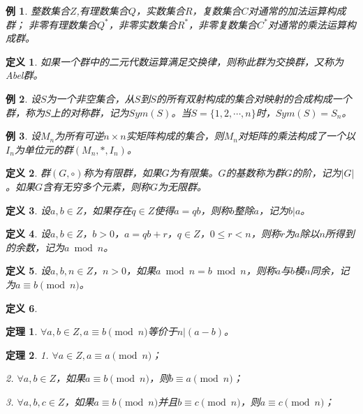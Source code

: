 \documentclass{article}
\newtheorem{Def}{定义}
\newtheorem{Thm}{定理}
\newtheorem*{Example}{例}
\begin{document}
\begin{CJK*}{UTF8}{gbsn}
\begin{Example}
  整数集合$Z$,有理数集合$Q$，实数集合$R$，复数集合$C$对通常的加法运算构成群；
  非零有理数集合$Q^*$，非零实数集合$R^*$，非零复数集合$C^*$对通常的乘法运算构成群。
\end{Example}
\begin{Def}
  如果一个群中的二元代数运算满足交换律，则称此群为交换群，又称为Abel群。
\end{Def}
\begin{Example}
设$S$为一个非空集合，从$S$到$S$的所有双射构成的集合对映射的合成构成一个群，称为$S$上的对称群，记为$Sym(S)$。当$S=\{1,2,\cdots,n\}$时，$Sym(S)=S_n$。
\end{Example}
  \begin{Example}
    设$M_n$为所有可逆$n\times n$实矩阵构成的集合，则$M_n$对矩阵的乘法构成了一个以$I_n$为单位元的群$(M_n,*,I_n)$。
  \end{Example}
\begin{Def}
  群$(G,\circ)$称为有限群，如果$G$为有限集。$G$的基数称为群$G$的阶，记为$|G|$。如果$G$含有无穷多个元素，则称$G$为无限群。
\end{Def}

\begin{Def}
  设$a,b\in Z$，如果存在$q\in Z$使得$a=qb$，则称$b$整除$a$，记为$b|a$。
\end{Def}
\begin{Def}
  设$a,b\in Z$，$b>0$，$a=qb+r$，$q\in Z$，$0\leq r<n$，则称$r$为$a$除以$n$所得到的余数，记为$a\bmod n$。
\end{Def}

\begin{Def}
  设$a,b,n\in Z$，$n>0$，如果$a\bmod n=b\bmod n$，则称$a$与$b$模$n$同余，记为$a \equiv b\pmod{n}$。
\end{Def}

\begin{Def}

\end{Def}
\begin{Thm}
  $\forall a,b\in Z, a\equiv b\pmod{n}$等价于$n|(a-b)$。
\end{Thm}

\begin{Thm}
  1. $\forall a\in Z, a \equiv a \pmod{n}$；

  2. $\forall a, b\in Z$，如果$a\equiv b \pmod{n}$，则$b\equiv a\pmod{n}$；

  3. $\forall a,b,c\in Z$，如果$a\equiv b\pmod{n}$并且$b\equiv c\pmod{n}$，则$a\equiv c\pmod{n}$；


\end{Thm}
\end{CJK*}
\end{document}
